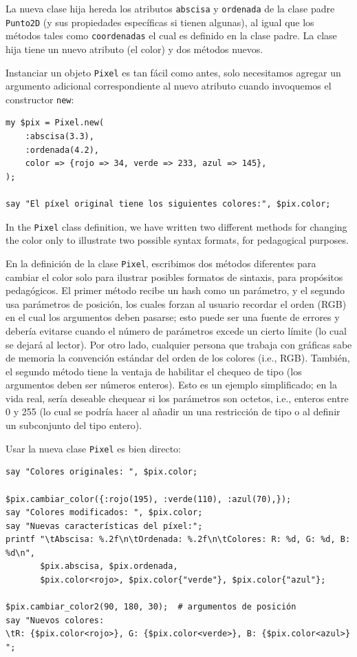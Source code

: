 La nueva clase hija hereda los atributos {\tt abscisa} y 
{\tt ordenada} de la clase padre {\tt Punto2D} (y sus 
propiedades específicas si tienen algunas), al igual que los
métodos tales como {\tt coordenadas} el cual es definido en
la clase padre. La clase hija tiene un nuevo atributo (el color)
y dos métodos nuevos.

Instanciar un objeto {\tt Pixel} es tan fácil como antes,
solo necesitamos agregar un argumento adicional correspondiente
al nuevo atributo cuando invoquemos el constructor {\tt new}:
\begin{verbatim}
my $pix = Pixel.new(
	:abscisa(3.3),
	:ordenada(4.2),
	color => {rojo => 34, verde => 233, azul => 145}, 
);

say "El píxel original tiene los siguientes colores:", $pix.color;
\end{verbatim}

In the {\tt Pixel} class definition, we have written 
two different methods for changing the color 
only to illustrate two possible syntax formats, for pedagogical 
purposes.

En la definición de la clase {\tt Pixel}, escribimos dos métodos
diferentes para cambiar el color solo para ilustrar posibles 
formatos de sintaxis, para propósitos pedagógicos. El primer método
recibe un hash como un parámetro, y el segundo usa parámetros de posición,
los cuales forzan al usuario recordar el orden (RGB) en el cual los
argumentos deben pasarse; esto puede ser una fuente de errores y 
debería evitarse cuando el número de parámetros excede un cierto 
límite (lo cual se dejará al lector). Por otro lado, cualquier 
persona que trabaja con gráficas sabe de memoria la convención estándar 
del orden de los colores (i.e., RGB). También, el segundo método
tiene la ventaja de habilitar el chequeo de tipo (los argumentos
deben ser números enteros). Esto es un ejemplo simplificado; en la
vida real, sería deseable chequear si los parámetros son octetos, i.e.,
enteros entre 0 y 255 (lo cual se podría hacer al añadir un
una restricción de tipo o al definir un subconjunto del tipo entero).

Usar la nueva clase {\tt Pixel} es bien directo:

\begin{verbatim}
say "Colores originales: ", $pix.color;

$pix.cambiar_color({:rojo(195), :verde(110), :azul(70),});
say "Colores modificados: ", $pix.color;
say "Nuevas características del píxel:";
printf "\tAbscisa: %.2f\n\tOrdenada: %.2f\n\tColores: R: %d, G: %d, B: %d\n",
       $pix.abscisa, $pix.ordenada, 
       $pix.color<rojo>, $pix.color{"verde"}, $pix.color{"azul"};

$pix.cambiar_color2(90, 180, 30);  # argumentos de posición
say "Nuevos colores:  
\tR: {$pix.color<rojo>}, G: {$pix.color<verde>}, B: {$pix.color<azul>} ";
\end{verbatim}

